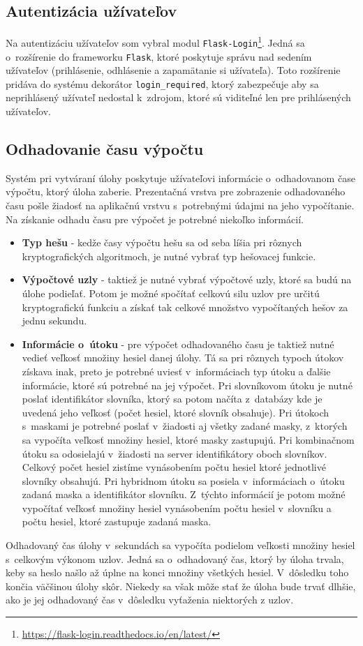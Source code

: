 \documentclass[slovak]{fitthesis}
\begin{document}
\subsection{Autentizácia užívateľov}
Na autentizáciu užívateľov som vybral modul \texttt{Flask-Login}\footnote{\url{https://flask-login.readthedocs.io/en/latest/}}. Jedná sa o~rozšírenie do frameworku \texttt{Flask}, ktoré poskytuje správu nad sedením užívateľov (prihlásenie, odhlásenie a zapamätanie si užívateľa). Toto rozšírenie pridáva do systému dekorátor \texttt{login\_required}, ktorý zabezpečuje aby sa neprihlásený užívateľ nedostal k~zdrojom, ktoré sú viditeľné len pre prihlásených užívateľov.


\subsection{Odhadovanie času výpočtu}
Systém pri vytváraní úlohy poskytuje užívateľovi informácie o~odhadovanom čase výpočtu, ktorý úloha zaberie. Prezentačná vrstva pre zobrazenie odhadovaného času pošle žiadosť na aplikačnú vrstvu s~potrebnými údajmi na jeho vypočítanie. Na získanie odhadu času pre výpočet je potrebné niekoľko informácií. 
\begin{itemize}
    \item \textbf{Typ hešu} - kedže časy výpočtu hešu sa od seba líšia pri rôznych kryptografických algoritmoch, je nutné vybrať typ hešovacej funkcie.
    \item \textbf{Výpočtové uzly} - taktiež je nutné vybrať výpočtové uzly, ktoré sa budú na úlohe podieľať. Potom je možné spočítať celkovú silu uzlov pre určitú kryptografickú funkciu a získať tak celkové množstvo vypočítaných hešov za jednu sekundu.
    \item \textbf{Informácie o~útoku} - pre výpočet odhadovaného času je taktiež nutné vedieť veľkosť množiny hesiel danej úlohy. Tá sa pri rôznych typoch útokov získava inak, preto je potrebné uviesť v~informáciach typ útoku a ďalšie informácie, ktoré sú potrebné na jej výpočet. Pri slovníkovom útoku je nutné poslať identifikátor slovníka, ktorý sa potom načíta z~databázy kde je uvedená jeho veľkosť (počet hesiel, ktoré slovník obsahuje). Pri útokoch s~maskami je potrebné poslať v~žiadosti aj všetky zadané masky, z~ktorých sa vypočíta veľkosť množiny hesiel, ktoré masky zastupujú. Pri kombinačnom útoku sa odosielajú v~žiadosti na server identifikátory oboch slovníkov. Celkový počet hesiel zistíme vynásobením počtu hesiel ktoré jednotlivé slovníky obsahujú. Pri hybridnom útoku sa posiela v~informáciach o~útoku zadaná maska a identifikátor slovníku. Z~týchto informácií je potom možné vypočítať veľkosť množiny hesiel vynásobením počtu hesiel v~slovníku a počtu hesiel, ktoré zastupuje zadaná maska.
\end{itemize}
Odhadovaný čas úlohy v~sekundách sa vypočíta podielom veľkosti množiny hesiel s~celkovým výkonom uzlov. Jedná sa o~odhadovaný čas, ktorý by úloha trvala, keby sa heslo našlo až úplne na konci množiny všetkých hesiel. V~dôsledku toho končia väčšinou úlohy skôr. Niekedy sa však môže stať že úloha bude trvať dlhšie, ako je jej odhadovaný čas v~dôsledku vyťaženia niektorých z uzlov.
\end{document}

